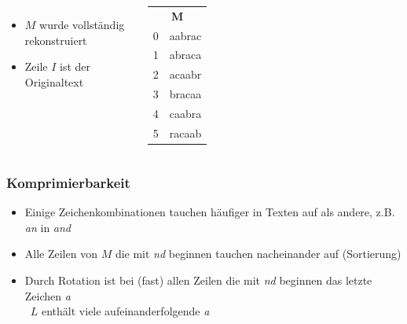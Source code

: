 \documentclass[14pt,xcolor=dvipsnames,pdftex]{beamer}
\begin{document}
\begin{frame}[allowframebreaks]
\begin{columns}
\end{columns}
\framebreak
\begin{columns}
\begin{itemize}
 \item $M$ wurde vollständig rekonstruiert
 \item Zeile $I$ ist der {\color{red}Originaltext}
\end{itemize}
\begin{tabular}{c|T}
     \\
    0 & aabrac \\
    {\color{red}1} & {\color{red}abraca}\\
    2 & acaabr \\
    3 & bracaa \\
    4 & caabra \\
    5 & racaab
\end{tabular}
\end{columns}
\end{frame}
\begin{frame}
 \frametitle{Komprimierbarkeit}
 \begin{itemize}
  \item Einige Zeichenkombinationen tauchen häufiger in Texten auf als andere, z.B. \textit{an} in \textit{and}
  \item Alle Zeilen von $M$ die mit \textit{nd} beginnen tauchen nacheinander auf (Sortierung)
  \item Durch Rotation ist bei (fast) allen Zeilen die mit \textit{nd} beginnen das letzte Zeichen \textit{a}\\
  \textrightarrow\ $L$ enthält viele aufeinanderfolgende \textit{a}
 \end{itemize}
\end{frame}

\end{document}
